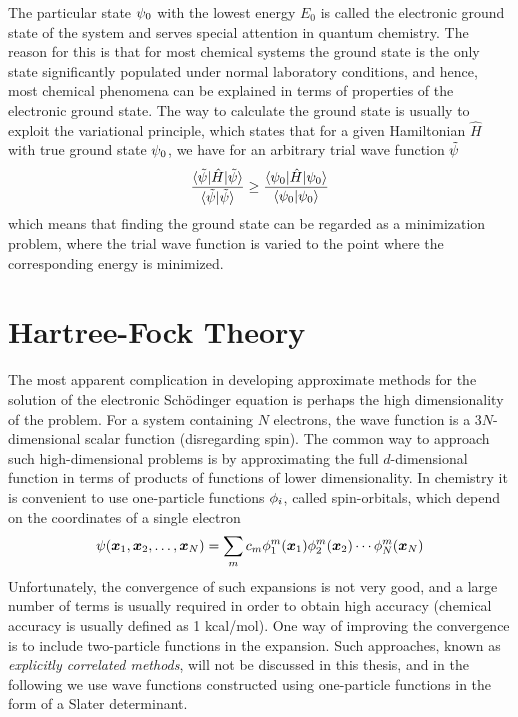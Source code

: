 The particular state $\psi_0$ with the lowest energy $E_0$ is called 
the electronic ground state of the system and serves special attention in quantum chemistry.
The reason for this is that for most chemical systems the ground state is the only state
significantly populated under normal laboratory conditions, and hence, most chemical 
phenomena can be explained in terms of properties of the electronic ground state. The way to
calculate the ground state is usually to exploit the variational principle, which states that
for a given Hamiltonian $\hat{H}$ with true ground state $\psi_0$, we have for an arbitrary
trial wave function $\tilde{\psi}$
\begin{equation}
    \label{eq:var_princ}
    \frac{\langle\tilde{\psi}|\hat{H}|\tilde{\psi}\rangle}
    {\langle\tilde{\psi}|\tilde{\psi}\rangle}
    \geq
    \frac{\langle\psi_0|\hat{H}|\psi_0\rangle}
    {\langle\psi_0|\psi_0\rangle}
\end{equation}
which means that finding the ground state can be regarded as a minimization problem, where
the trial wave function is varied to the point where the corresponding energy is minimized.

\section{Hartree-Fock Theory}\label{sec:HFT}
The most apparent complication in developing approximate methods for the solution of the 
electronic Sch\"{o}dinger equation is perhaps the high dimensionality of the problem. For
a system containing $N$ electrons, the wave function is a $3N$-dimensional scalar function 
(disregarding spin). The common way to approach such high-dimensional problems is by
approximating the full $d$-dimensional function in terms of products of functions of lower 
dimensionality. In chemistry it is convenient to use one-particle functions $\phi_i$, 
called spin-orbitals, which depend on the coordinates of a single electron
\begin{equation}
    \label{eq:orb_exp}
    \psi(\boldsymbol x_1,\boldsymbol x_2,\dots,\boldsymbol x_N) = \sum_m c_m 
	\phi_1^m(\boldsymbol x_1)
	\phi_2^m(\boldsymbol x_2)\cdots
	\phi_N^m(\boldsymbol x_N)
\end{equation}
Unfortunately, the convergence of such expansions is not very good, and a large number
of terms is usually required in order to obtain high accuracy (chemical accuracy is usually
defined as 1 kcal/mol). One way of improving the convergence is to include two-particle 
functions in the expansion. Such approaches, known as 
\emph{explicitly correlated methods}\cite{Rychlewski:2003,Kong:2012}, will not be discussed
in this thesis, and in the following we use wave functions constructed using one-particle 
functions in the form of a Slater determinant.

